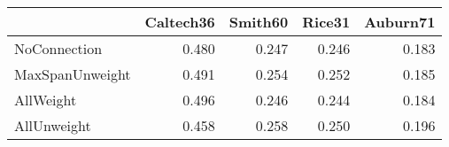 \begin{tabular}{lrrrr}
\toprule
{} & Caltech36 & Smith60 & Rice31 & Auburn71 \\
\midrule
NoConnection    &     0.480 &   0.247 &  0.246 &    0.183 \\
MaxSpanUnweight &     0.491 &   0.254 &  0.252 &    0.185 \\
AllWeight       &     0.496 &   0.246 &  0.244 &    0.184 \\
AllUnweight     &     0.458 &   0.258 &  0.250 &    0.196 \\
\bottomrule
\end{tabular}
